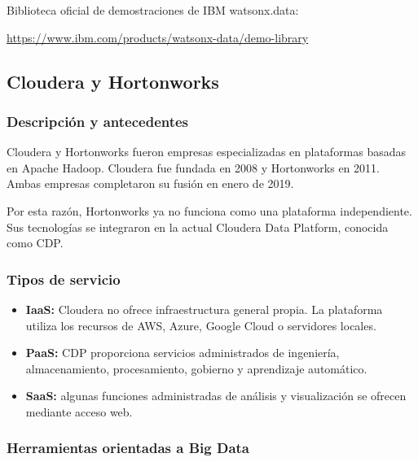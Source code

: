 Biblioteca oficial de demostraciones de IBM watsonx.data:

\url{https://www.ibm.com/products/watsonx-data/demo-library}


\subsection{Cloudera y Hortonworks}

\subsubsection*{Descripción y antecedentes}

Cloudera y Hortonworks fueron empresas especializadas en plataformas basadas
en Apache Hadoop. Cloudera fue fundada en 2008 y Hortonworks en 2011. Ambas
empresas completaron su fusión en enero de 2019.

Por esta razón, Hortonworks ya no funciona como una plataforma independiente.
Sus tecnologías se integraron en la actual Cloudera Data Platform, conocida
como CDP.

\subsubsection*{Tipos de servicio}

\begin{itemize}
    \item \textbf{IaaS:} Cloudera no ofrece infraestructura general propia. La
    plataforma utiliza los recursos de AWS, Azure, Google Cloud o servidores
    locales.
    
    \item \textbf{PaaS:} CDP proporciona servicios administrados de ingeniería,
    almacenamiento, procesamiento, gobierno y aprendizaje automático.
    
    \item \textbf{SaaS:} algunas funciones administradas de análisis y
    visualización se ofrecen mediante acceso web.
\end{itemize}

\subsubsection*{Herramientas orientadas a Big Data}

